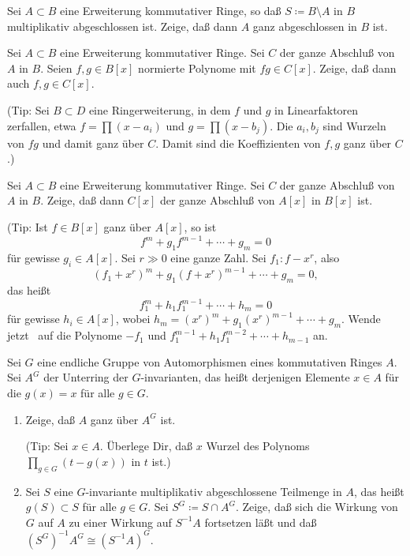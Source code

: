 \begin{exercise}
	Sei \(A \subset B\) eine Erweiterung kommutativer Ringe, so daß
	\(S \coloneqq B \setminus A\) in \(B\) multiplikativ abgeschlossen ist.
	Zeige, daß dann \(A\) ganz abgeschlossen in \(B\) ist.
\end{exercise}

\begin{exercise}
	\label{exer:product_poly_in_closure}
	Sei \(A \subset B\) eine Erweiterung kommutativer Ringe. Sei \(C\) der
	ganze Abschluß von \(A\) in \(B\). Seien \(f, g \in B[x]\) normierte
	Polynome mit \(fg \in C[x]\). Zeige, daß dann auch \(f, g \in C[x]\).
	
	(Tip: Sei \(B \subset D\) eine Ringerweiterung, in dem \(f\) und \(g\)
	in Linearfaktoren zerfallen, etwa \(f = \prod (x - a_i)\) und \(g = \prod
	(x - b_j)\). Die \(a_i, b_j\) sind Wurzeln von \(fg\) und damit ganz über
	\(C\). Damit sind die Koeffizienten von \(f, g\) ganz über \(C\).)
\end{exercise}

\begin{exercise}
	Sei \(A \subset B\) eine Erweiterung kommutativer Ringe. Sei \(C\) der
	ganze Abschluß von \(A\) in \(B\). Zeige, daß dann \(C[x]\) der ganze
	Abschluß von \(A[x]\) in \(B[x]\) ist.

	(Tip: Ist \(f \in B[x]\) ganz über \(A[x]\), so ist \[f^m + g_1 f^{m - 1}
	+ \dotsb + g_m = 0\] für gewisse \(g_i \in A[x]\). Sei \(r \gg 0\) eine ganze
	Zahl. Sei \(f_1 \colon f - x^r\), also
	\[(f_1 + x^r)^m + g_1 (f + x^r)^{m - 1} + \dotsb + g_m = 0,\]
	das heißt \[f_1^m + h_1 f_1^{m - 1} + \dotsb + h_m = 0\]
	für gewisse \(h_i \in A[x]\), wobei \(h_m = (x^r)^m + g_1(x^r)^{m - 1}
	+ \dotsb + g_m\). Wende jetzt~ auf
	die Polynome \(-f_1\) und \(f_1^{m - 1} + h_1 f_1^{m - 2} + \dotsb +
	h_{m - 1}\) an.
\end{exercise}

\begin{exercise}
	Sei \(G\) eine endliche Gruppe von Automorphismen eines kommutativen Ringes
	\(A\). Sei \(A^G\) der Unterring der \(G\)-invarianten, das heißt derjenigen
	Elemente \(x \in A\) für die \(g(x) = x\) für alle \(g \in G\).
	\begin{enumerate}
	\item
		Zeige, daß \(A\) ganz über \(A^G\) ist.
	
		(Tip: Sei \(x \in A\). Überlege Dir, daß \(x\) Wurzel des Polynoms
		\(\prod\limits_{g \in G} (t - g(x))\) in \(t\) ist.)
	\item
		Sei \(S\) eine \(G\)-invariante multiplikativ abgeschlossene Teilmenge
		in \(A\), das heißt \(g(S) \subset S\) für alle \(g \in G\). Sei
		\(S^G \coloneqq S \cap A^G\). Zeige, daß sich die Wirkung von \(G\)
		auf \(A\) zu einer Wirkung auf \(S^{-1} A\) fortsetzen läßt und daß
		\((S^G)^{-1} A^G \cong (S^{-1} A)^G\).
	\end{enumerate}
\end{exercise}

